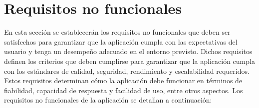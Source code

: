 
\section{Requisitos no funcionales}\label{sec:requisitos-no-funcionales}

En esta sección se establecerán los requisitos no funcionales que deben ser satisfechos para garantizar que la aplicación cumpla con las expectativas del usuario y tenga un desempeño adecuado en el entorno previsto. Dichos requisitos definen los criterios que deben cumplirse para garantizar que la aplicación cumpla con los estándares de calidad, seguridad, rendimiento y escalabilidad requeridos. Estos requisitos determinan cómo la aplicación debe funcionar en términos de fiabilidad, capacidad de respuesta y facilidad de uso, entre otros aspectos. Los requisitos no funcionales de la aplicación se detallan a continuación:


